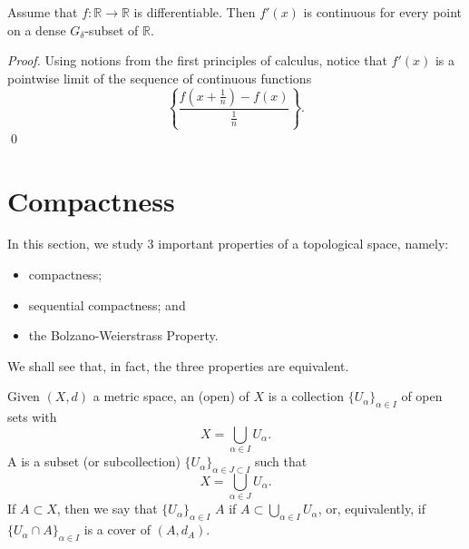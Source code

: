 \documentclass[notoc,notitlepage]{tufte-book}
\begin{document}
\begin{crly}\label{crly:derivative_of_a_function_is_continuous_on_a_dense_g_delta_set_in_r_}
  Assume that $f : \mathbb{R} \to \mathbb{R}$ is differentiable. Then $f'(x)$ is continuous for every point on a dense $G_\delta$-subset of $\mathbb{R}$.
\end{crly}

\begin{proof}
  Using notions from the first principles of calculus, notice that $f'(x)$ is a pointwise limit of the sequence of continuous functions
  \begin{equation*}
    \left\{ \frac{f \left( x + \frac{1}{n} \right) - f(x)}{\frac{1}{n}} \right\}.
  \end{equation*}\qed\
\end{proof}


\section{Compactness}%
\label{sec:compactness}

In this section, we study 3 important properties of a topological space, namely:
\begin{itemize}
  \item compactness;
  \item sequential compactness; and
  \item the Bolzano-Weierstrass Property.
\end{itemize}
We shall see that, in fact, the three properties are equivalent.

\begin{defn}[Cover]\label{defn:cover}
  Given $(X, d)$ a metric space, an (open)  of $X$ is a collection $\{ U_\alpha \}_{\alpha \in I}$ of open sets with
  \begin{equation*}
    X = \bigcup_{\alpha \in I} U_\alpha.
  \end{equation*}
  A  is a subset (or subcollection) $\{ U_\alpha \}_{\alpha \in J \subset I}$ such that
  \begin{equation*}
    X = \bigcup_{\alpha \in J} U_\alpha.
  \end{equation*}
  If $A \subset X$, then we say that $\{ U_\alpha \}_{\alpha \in I}$  $A$ if $A \subset \bigcup_{\alpha \in I} U_\alpha$, or, equivalently, if $\{ U_\alpha \cap A \}_{\alpha \in I}$ is a cover of $(A, d_A)$.
\end{defn}
\end{document}

